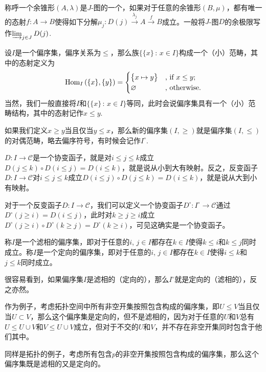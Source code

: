 称呼一个余锥形$(A,\lambda)$是$J$-图的一个，如果对于任意的余锥形$(B,\mu)$，都有唯一的态射$f:A\to B$使得如下分解$\mu_j:D(j)\xrightarrow{\lambda_j}A\xrightarrow{f}B$成立。一般将$J$-图$D$的余极限写作$\varinjlim_{j\in J} D(j)$.

\para 设$I$是一个偏序集，偏序关系为$\leq$，那么族$\{\{x\}\,:\, x\in I\}$构成一个（小）范畴，其中的态射定义为
\[
	\operatorname{Hom}_{I}\left(\{x\},\{y\}\right)=\begin{cases}
	\bigl\{x\mapsto y\bigr\}&\text{, if }x\leq y\text{;}\\
	\varnothing&\text{, otherwise}.
	\end{cases}
\]
当然，我们一般直接将$I$和$\{\{x\}\,:\, x\in I\}$等同，此时会说偏序集具有一个（小）范畴结构，其中的态射记作$x\leq y$.

如果我们定义$x\geq y$当且仅当$y\leq x$，那么新的偏序集$(I,\geq)$就是偏序集$(I,\leq)$的对偶范畴，略去偏序符号，有时候会记作$I^\circ$.

$D:I\to \mathcal{C}$是一个协变函子，就是对$i\leq j\leq k$成立$D(j\leq k)\circ D(i\leq j)=D(i\leq k)$，就是说从小到大有映射。反之，反变函子$D:I\to \mathcal{C}$对$i\leq j\leq k$成立$D(i\leq j)\circ D(j\leq k)=D(i\leq k)$，就是说从大到小有映射。

对于一个反变函子$D:I\to \mathcal{C}$，我们可以定义一个协变函子$D^\circ :I^\circ\to \mathcal{C}$通过$D^\circ(j\geq i)=D(i\leq j)$，此时对$k\geq j\geq i$成立$D^\circ(j\geq i)\circ D^\circ(k\geq j)=D^\circ(k\geq i)$，可见这确实是一个协变函子。

\para 称$I$是一个滤相的偏序集，即对于任意的$i$, $j\in I$都存在$k\in I$使得$k\leq i$和$k\leq j$同时成立。称$I$是一个定向的偏序集，即对于任意的$i$, $j\in I$都存在$k\in I$使得$i\leq k$和$j\leq k$同时成立。

很容易看到，如果偏序集$I$是滤相的（定向的），那么$I^\circ$就是定向的（滤相的），反之亦然。

作为例子，考虑拓扑空间中所有非空开集按照包含构成的偏序集，即$U\leq V$当且仅当$U\subset V$，那么这个偏序集是定向的，但不是滤相的，因为对于任意的$U$和$V$总有$U\leq U\cup V$和$V\leq U\cup V$成立，但对于不交的$U$和$V$，并不存在非空开集同时包含于他们其中。

同样是拓扑的例子，考虑所有包含$p$的非空开集按照包含构成的偏序集，那么这个偏序集既是滤相的又是定向的。

